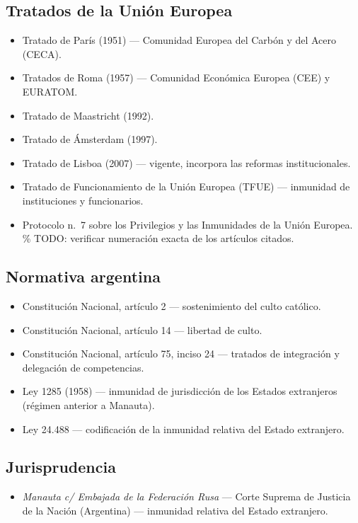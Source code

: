 \documentclass[12pt,oneside]{book}
\begin{document}
\subsection*{Tratados de la Unión Europea}
\begin{itemize}
    \item Tratado de París (1951) --- Comunidad Europea del Carbón y del Acero (CECA).
    \item Tratados de Roma (1957) --- Comunidad Económica Europea (CEE) y EURATOM.
    \item Tratado de Maastricht (1992).
    \item Tratado de Ámsterdam (1997).
    \item Tratado de Lisboa (2007) --- vigente, incorpora las reformas institucionales.
    \item Tratado de Funcionamiento de la Unión Europea (TFUE) --- inmunidad de instituciones y funcionarios.
    \item Protocolo n.\textordmasculine{}~7 sobre los Privilegios y las Inmunidades de la Unión Europea. \% TODO: verificar numeración exacta de los artículos citados.
\end{itemize}

\subsection*{Normativa argentina}
\begin{itemize}
    \item Constitución Nacional, artículo 2 --- sostenimiento del culto católico.
    \item Constitución Nacional, artículo 14 --- libertad de culto.
    \item Constitución Nacional, artículo 75, inciso 24 --- tratados de integración y delegación de competencias.
    \item Ley 1285 (1958) --- inmunidad de jurisdicción de los Estados extranjeros (régimen anterior a Manauta).
    \item Ley 24.488 --- codificación de la inmunidad relativa del Estado extranjero.
\end{itemize}

\subsection*{Jurisprudencia}
\begin{itemize}
    \item \emph{Manauta c/ Embajada de la Federación Rusa} --- Corte Suprema de Justicia de la Nación (Argentina) --- inmunidad relativa del Estado extranjero.
\end{itemize}
\end{document}
